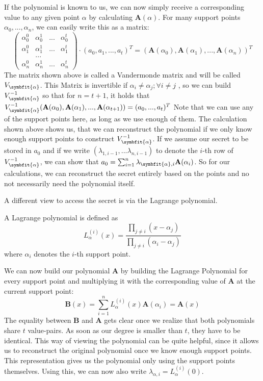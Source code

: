 \documentclass[english, version-2020-11]{uzl-thesis}
\begin{document}
    If the polynomial is known to us, we can now simply receive a corresponding value to any given point $\alpha$ by calculating $\mathbf{A}(\alpha)$. For many support points $\alpha_0,...,\alpha_n$, we can easily write this as a matrix:
    \[\begin{pmatrix}
\alpha_0^0 & \alpha_0^1 & ... & \alpha_0^t\\
\alpha_1^0 & \alpha_1^1 & ... & \alpha_1^t\\
     &...       &     &\\
\alpha_n^0 & \alpha_n^1 & ... & \alpha_n^t
\end{pmatrix} \cdot(a_0,a_1,...,a_t)^T=(\mathbf{A}(\alpha_0),\mathbf{A}(\alpha_1),...,\mathbf{A}(\alpha_n))^T\]
  The matrix shown above is called a Vandermonde matrix and will be called $V_{\symbfit{\alpha}}$. This Matrix is invertible if $\alpha_i \neq \alpha_j; \forall i \neq j$ , so we can build $V_{\symbfit{\alpha}}^{-1}$ so that for $n=t+1$, it holds that$ V^{-1}_{\symbfit{\alpha}}(\mathbf{A}(\alpha_0),\mathbf{A}(\alpha_1),...,\mathbf{A}(\alpha_{t+1}))=(a_0,...,a_t)^T  $
  Note that we can use any of the support points here, as long as we use enough of them. The calculation shown above shows us, that we can reconstruct the polynomial if we only know enough support points to construct $V^{-1}_{\symbfit{\alpha}}$. If we assume our secret to be stored in $a_0$ and if we write $(\lambda_{1,i-1},...\lambda_{n,i-1})$ to denote the $i$-th row of $V^{-1}_{\symbfit{\alpha}}$, we can show that $a_0=\sum_{i=1}^{n}\lambda_{\symbfit{\alpha},i} \mathbf{A}(\alpha_i)$. So for our calculations, we can reconstruct the secret entirely based on the points and no not necessarily need the polynomial itself. 
  
  A different view to access the secret is via the Lagrange polynomial.
  \begin{definition}\cite{SkriptBerndt}
    A Lagrange polynomial is defined as \[ L_{\alpha}^{(i)}(x)=\frac{\prod_{j \neq i}(x-\alpha_j)}{\prod_{j \neq i}(\alpha_i-\alpha_j)}\]
  where $\alpha_i$ denotes the $i$-th support point. 
  \end{definition}
  We can now build our polynomial \textbf{A} by building the Lagrange Polynomial for every support point and multiplying it with the corresponding value of \textbf{A} at the current support point:
  \[ \textbf{B}(x)=\sum_{i=1}^{n}L_{\alpha}^{(i)}(x)\textbf{A}(\alpha_i)=\textbf{A}(x)\]
  The equality between \textbf{B} and \textbf{A} gets clear once we realize that both polynomials share $t$ value-pairs. As soon as our degree is smaller than $t$, they have to be identical. This way of viewing the polynomial can be quite helpful, since it allows us to reconstruct the original polynomial once we know enough support points.
  This representation gives us the polynomial only using the support points themselves. Using this, we can now also write $\lambda_{\alpha,i}= L_{\alpha}^{(i)}(0)$.
\end{document}
